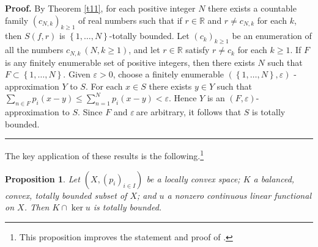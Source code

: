 \documentclass{article}%
\newtheorem{proposition}[theorem]{Proposition}
\newenvironment{proof}[1][Proof]{\noindent\textbf{#1.} }{\ \rule{0.5em}{0.5em}}
\begin{document}
\begin{proof}
By Theorem \ref{t11}, for each positive integer $N$ there exists a countable
family $\left(  c_{N,k}\right)  _{k\geq1}$ of real numbers such that if
$r\in\mathbb{R}$ and $r\neq c_{N,k}$ for each $k$, then $S(f,r)$ is $\left\{
1,\ldots,N\right\}  $-totally bounded. Let $\left(  c_{k}\right)  _{k\geq1}$
be an enumeration of all the numbers $c_{N,k}\ (N,k\geq1)$, and let
$r\in\mathbb{R}$ satisfy $r\neq c_{k}$ for each $k\geq1$. If $F$ is any
finitely enumerable set of positive integers, then there exists $N$ such that
$F\subset\left\{  1,\ldots,N\right\}  $. Given $\varepsilon>0$, choose a
finitely enumerable $(\left\{  1,\ldots,N\right\}  ,\varepsilon)$%
-approximation $Y$ to $S$. For each $x\in S$ there exists $y\in Y$ such that
$\sum_{n\in F}p_{i}(x-y)\leq\sum_{n=1}^{N}p_{i}(x-y)<\varepsilon$. Hence $Y$
is an $(F,\varepsilon)$-approximation to $S$. Since $F$ and $\varepsilon\ $are
arbitrary, it follows that $S$ is totally bounded.
\end{proof}

%

\medskip


The key application of these results is the following.\footnote{%
\normalfont\sf
This proposition improves the statement and proof of \cite[5.4.9]{BVtech}.}

\begin{proposition}
\label{p22}Let $\left(  X,\left(  p_{i}\right)  _{i\in I}\right)  $ be a
locally convex space; $K$ a balanced, convex, totally bounded subset of $X$;
and $u$ a nonzero continuous linear functional on $X$. Then $K\cap\ker u$ is
totally bounded.
\end{proposition}
\end{document}

